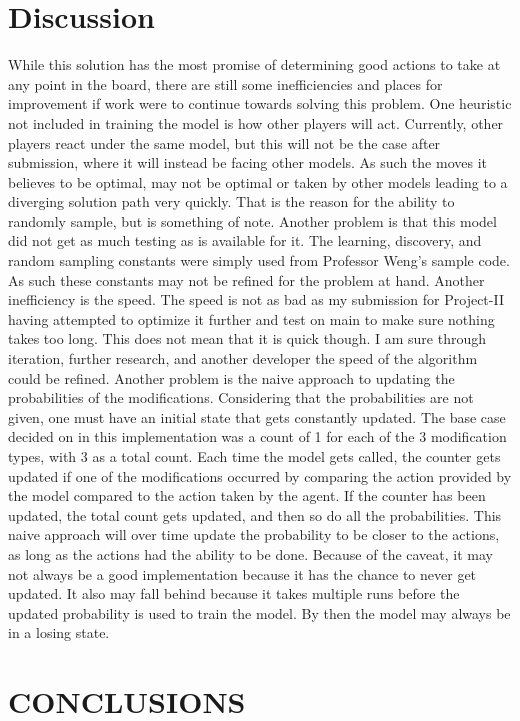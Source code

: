 \documentclass[letterpaper, 10 pt, conference]{ieeeconf}   %
\begin{document}
\section{Discussion}
While this solution has the most promise of determining good actions to take at any point in the board, there are still some inefficiencies and places for improvement if
work were to continue towards solving this problem. One heuristic not included in training the model is how other players will act.
Currently, other players react under the same model, but this will not be the case after submission, where it will instead be facing other models. As such
the moves it believes to be optimal, may not be optimal or taken by other models leading to a diverging solution path very quickly.
That is the reason for the ability to randomly sample, but is something of note. Another problem is that this model did not get as much testing as is available for it.
The learning, discovery, and random sampling constants were simply used from Professor Weng's sample code. As such
these constants may not be refined for the problem at hand. Another inefficiency is the speed. The speed is not as bad as my submission for Project-II having attempted
to optimize it further and test on main to make sure nothing takes too long. This does not mean that it is quick though. I am sure through iteration, further research,
and another developer the speed of the algorithm could be refined. Another problem is the naive approach to updating the probabilities of the modifications.
Considering that the probabilities are not given, one must have an initial state that gets constantly updated. The base case decided on in this implementation was a count of 1 for each of
the 3 modification types, with 3 as a total count. Each time the model gets called, the counter gets updated if one of the modifications occurred by comparing the action provided by the model
compared to the action taken by the agent. If the counter has been updated, the total count gets updated, and then so do all the probabilities. This naive approach will over time update the probability to be
closer to the actions, as long as the actions had the ability to be done. Because of the caveat, it may not always be a good implementation because it has the chance to never get updated. It also may fall behind
because it takes multiple runs before the updated probability is used to train the model. By then the model may always be in a losing state.

\section{CONCLUSIONS}
\end{document}
